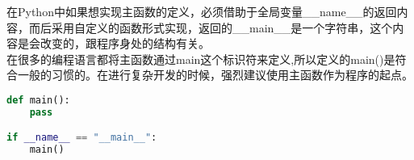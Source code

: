 在Python中如果想实现主函数的定义，必须借助于全局变量\_\_name\_\_的返回内容，而后采用自定义的函数形式实现，返回的\_\_main\_\_是一个字符串，这个内容是会改变的，跟程序身处的结构有关。\\

在很多的编程语言都将主函数通过main这个标识符来定义,所以定义的main()是符合一般的习惯的。在进行复杂开发的时候，强烈建议使用主函数作为程序的起点。\\


\begin{lstlisting}[language=Python]
def main():
    pass

if __name__ == "__main__":
    main()
\end{lstlisting}

\newpage










